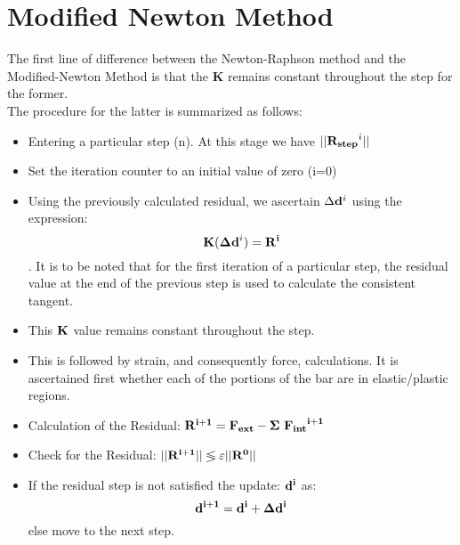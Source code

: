 \documentclass[11pt]{article}
\begin{document}
\section{Modified Newton Method}
The first line of difference between the Newton-Raphson method and the Modified-Newton Method is that the {\bf K} remains constant throughout the step for the former.\\The procedure for the latter is summarized as follows:
\begin{itemize}
\item Entering a particular step (n).  At this stage we have $||{\bf R_{step}}^i||$
\item Set the iteration counter to an initial value of zero (i=0)
\item Using the previously calculated residual, we ascertain $\Delta {\bf d}^i$ using the expression: $${\bf K}({\bf \Delta d}^i)=\bf R^i$$. It is to be noted that for the first iteration of a particular step, the residual value at the end of the previous step is used to calculate the consistent tangent.
\item This $\bf K$ value remains constant throughout the step.
\item This is followed by strain, and consequently force, calculations. It is ascertained first whether each of the portions of the bar are in elastic/plastic regions. 
\item Calculation of the Residual: $\bf R^{i+1}=F_{ext}-\Sigma\ {F_{int}}^{i+1}$ 
\item Check for the Residual: $\bf ||R^{i+1}|| \lessgtr \varepsilon||R^{0}||$
\item If the residual step is not satisfied  the update: ${\bf d^i}$ as: $$\bf d^{i+1}=d^{i}+\Delta d^i$$ else move to the next step.
\end{itemize}
\end{document}
